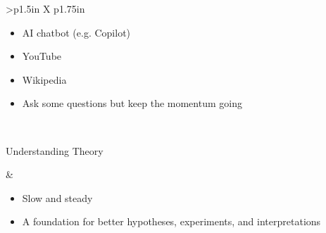 \documentclass[8pt]{extarticle}
\begin{document}
\begin{tabularx}{\linewidth}{>{\bfseries}p{1.5in} X p{1.75in}}
\begin{minipage}[t]{\linewidth}
                            \begin{sourcesBox}
                            \begin{itemize}[nosep,leftmargin=*]
                                \item AI chatbot (e.g. Copilot)
                                \item YouTube
                                \item Wikipedia
                            \end{itemize}
                            \end{sourcesBox}

                            \begin{tipsBox}
                            \begin{itemize}[nosep,leftmargin=*]
                                \item Ask some questions but keep the momentum going
                            \end{itemize}
                            \end{tipsBox}
                        \end{minipage}

                            \\

    \addlinespace %

    \begin{minipage}[t]{\linewidth}
        \vspace{0pt}
        Understanding Theory
    \end{minipage}

            &   \begin{minipage}[t]{\linewidth}
                    \vspace{0pt}

                    \begin{whatBox}
                    \begin{itemize}[nosep,leftmargin=*]
                        \item Slow and steady
                        \item A foundation for better hypotheses, experiments, and interpretations
                    \end{itemize}
                    \end{whatBox}


\end{minipage}
\end{tabularx}
\end{document}
